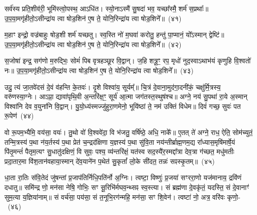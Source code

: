 {\anuvakamend[{असा॑वि स॒प्तविꣳ॑शतिः}]}%

सर्व॑स्य प्रति॒शीव॑री॒ भूमि॑स्त्वो॒पस्थ॒ आ\-ऽधि॑त। स्यो॒ना\-ऽस्मै॑ सु॒षदा॑ भव॒ यच्छा᳚स्मै॒ शर्म॑ स॒प्रथाः᳚॥ उ॒प॒या॒मगृ॑हीतो॒\-ऽसीन्द्रा॑य त्वा षोड॒शिन॑ ए॒ष ते॒ योनि॒रिन्द्रा॑य त्वा षोड॒शिने᳚॥~(४१)

{\anuvakamend[{सर्व॑स्य॒ षड्विꣳ॑शतिः}]}%

म॒हाꣳ इन्द्रो॒ वज्र॑बाहुः षोड॒शी शर्म॑ यच्छतु। स्व॒स्ति नो॑ म॒घवा॑ करोतु॒ हन्तु॑ पा॒प्मानं॒ यो᳚\-ऽस्मान् द्वेष्टि॑॥ उ॒प॒या॒मगृ॑हीतो॒\-ऽसीन्द्रा॑य त्वा षोड॒शिन॑ ए॒ष ते॒ योनि॒रिन्द्रा॑य त्वा षोड॒शिने᳚॥~(४२)

{\anuvakamend[{सर्व॑स्य म॒हान्थ्षड्विꣳ॑शतिः॒ षड्विꣳ॑शतिः}]}%

स॒जोषा॑ इन्द्र॒ सग॑णो म॒रुद्भिः॒ सोमं॑ पिब वृत्रहञ्छूर वि॒द्वान्। ज॒हि शत्रू॒ꣳ॒ रप॒ मृधो॑ नुद॒स्वा\-ऽथाभ॑यं कृणुहि वि॒श्वतो॑ नः॥ उ॒प॒या॒मगृ॑हीतो॒\-ऽसीन्द्रा॑य त्वा षोड॒शिन॑ ए॒ष ते॒ योनि॒रिन्द्रा॑य त्वा षोड॒शिने᳚॥~(४३)

{\anuvakamend[{स॒जोषा᳚स्त्रि॒ꣳ॒शत्}]}%

उदु॒ त्यं जा॒तवे॑दसं दे॒वं व॑हन्ति के॒तवः॑। दृ॒शे विश्वा॑य॒ सूर्यम्᳚॥ चि॒त्रं दे॒वाना॒मुद॑गा॒दनी॑कं॒ चक्षु॑र्मि॒त्रस्य॒ वरु॑णस्या॒ग्नेः। आ\-ऽप्रा॒ द्यावा॑\-पृथि॒वी अ॒न्तरि॑क्ष॒ꣳ॒ सूर्य॑ आ॒त्मा जग॑तस्त॒स्थुष॑श्च॥ अग्ने॒ नय॑ सु॒पथा॑ रा॒ये अ॒स्मान् विश्वा॑नि देव व॒युना॑नि वि॒द्वान्। यु॒यो॒ध्य॑स्मज्जु॑हुरा॒णमेनो॒ भूयि॑ष्ठां ते॒ नम॑ उक्तिं विधेम॥ दिवं॑ गच्छ॒ सुवः॑ पत रू॒पेण॑~(४४)

वो रू॒पम॒भ्यैमि॒ वय॑सा॒ वयः॑। तु॒थो वो॑ वि॒श्ववे॑दा॒ वि भ॑जतु॒ वर्\mbox{}षि॑ष्ठे॒ अधि॒ नाके᳚॥ ए॒तत् ते॑ अग्ने॒ राध॒ ऐति॒ सोम॑च्युतं॒ तन्मि॒त्रस्य॑ प॒था न॑य॒र्तस्य॑ प॒था प्रेत॑ च॒न्द्रद॑क्षिणा य॒ज्ञस्य॑ प॒था सु॑वि॒ता नय॑न्तीर्ब्राह्म॒णम॒द्य रा᳚ध्यास॒मृषि॑मार्\mbox{}षे॒यं पि॑तृ॒मन्तं॑ पैतृम॒त्यꣳ सु॒धातु॑दक्षिणं॒ वि सुवः॒ पश्य॒ व्य॑न्तरि॑क्षं॒ यत॑स्व सद॒स्यै॑र॒स्मद्दा᳚त्रा देव॒त्रा ग॑च्छत॒ मधु॑मतीः प्रदा॒तार॒मा वि॑श॒तान॑वहाया॒स्मान् दे॑व॒याने॑न प॒थेत॑ सु॒कृतां᳚ लो॒के सी॑दत॒ तन्नः॑ सꣴस्कृ॒तम्॥~(४५)

{\anuvakamend[{रू॒पेण॑ सद॒स्यै॑र॒ष्टाद॑श च}]}%

धा॒ता रा॒तिः स॑वि॒तेदं जु॑षन्तां प्र॒जा\-प॑तिर्निधि॒पति॑र्नो अ॒ग्निः। त्वष्टा॒ विष्णुः॑ प्र॒जया॑ सꣳररा॒णो यज॑मानाय॒ द्रवि॑णं दधातु॥ समि॑न्द्र णो॒ मन॑सा नेषि॒ गोभिः॒ सꣳ सू॒रिभि॑र्मघव॒न्थ्सꣴ स्व॒स्त्या। सं ब्रह्म॑णा दे॒वकृ॑तं॒ यदस्ति॒ सं दे॒वानाꣳ॑ सुम॒त्या य॒ज्ञिया॑नाम्॥ सं वर्च॑सा॒ पय॑सा॒ सं त॒नूभि॒रग॑न्महि॒ मन॑सा॒ सꣳ शि॒वेन॑। त्वष्टा॑ नो॒ अत्र॒ वरि॑वः कृणो॒-~(४६)

